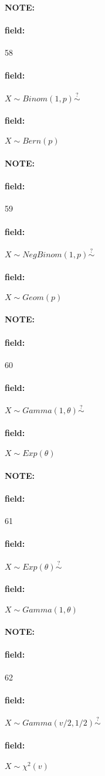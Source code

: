 \documentclass[12pt]{article}
\newenvironment{note}{\paragraph{NOTE:}}{}
\newenvironment{field}{\paragraph{field:}}{}
\begin{document}
\begin{note}
  \begin{field}
    \tiny 58
  \end{field}
  \begin{field}
    $X \sim Binom(1,p) \overset{?}{\sim}$
  \end{field}
  \begin{field}
    $X \sim Bern(p)$
  \end{field}
\end{note}

\begin{note}
  \begin{field}
    \tiny 59
  \end{field}
  \begin{field}
    $X \sim NegBinom(1,p) \overset{?}{\sim}$
  \end{field}
  \begin{field}
    $X \sim Geom(p)$
  \end{field}
\end{note}

\begin{note}
  \begin{field}
    \tiny 60
  \end{field}
  \begin{field}
    $X \sim Gamma(1,\theta) \overset{?}{\sim}$
  \end{field}
  \begin{field}
    $X \sim Exp(\theta)$
  \end{field}
\end{note}

\begin{note}
  \begin{field}
    \tiny 61
  \end{field}
  \begin{field}
    $X \sim Exp(\theta) \overset{?}{\sim}$
  \end{field}
  \begin{field}
    $X \sim Gamma(1,\theta)$
  \end{field}
\end{note}

\begin{note}
  \begin{field}
    \tiny 62
  \end{field}
  \begin{field}
    $X \sim Gamma(v/2,1/2) \overset{?}{\sim} $
  \end{field}
  \begin{field}
    $X \sim \chi^2(v)$
  \end{field}
\end{note}
\end{document}
